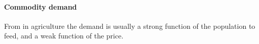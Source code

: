 \documentclass[a4paper,12pt]{article} %
\begin{document}
\paragraph{Commodity demand}
From \cite{zulfiqarDevelopmentSupplyDemand2010} in agriculture the demand is usually a strong function of the population to feed, and a weak function of the price.
\end{document}
